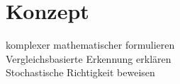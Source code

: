 \chapter{Konzept}\label{ch:konzept}

komplexer mathematischer formulieren\\
Vergleichsbasierte Erkennung erklären\\
Stochastische Richtigkeit beweisen\\


\begin{deprecated}
\cite{davis93}


\end{deprecated}
